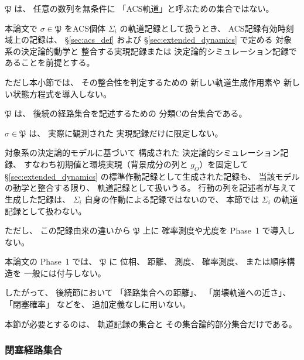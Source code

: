 \begin{remark}[軌道記録空間の力学的意味]
\label{rem:trajectory_space_scope}
$\mathfrak{P}$ は、
任意の数列を無条件に
「ACS軌道」と呼ぶための集合ではない。

本論文で
$\sigma\in\mathfrak{P}$
をACS個体 $\Sigma_i$ の軌道記録として扱うとき、
ACS記録有効時刻域上の記録は、
\S\ref{sec:acs_def}
および
\S\ref{sec:extended_dynamics}
で定める
対象系の決定論的動学と
整合する実現記録または
決定論的シミュレーション記録であることを前提とする。

ただし本小節では、
その整合性を判定するための
新しい軌道生成作用素や
新しい状態方程式を導入しない。

$\mathfrak{P}$ は、
後続の経路集合を記述するための
分類Cの台集合である。
\end{remark}

\begin{remark}
\label{rem:trajectory_record_origin}
$\sigma\in\mathfrak{P}$
は、
実際に観測された
実現記録だけに限定しない。

対象系の決定論的モデルに基づいて
構成された
決定論的シミュレーション記録、
すなわち初期値と環境実現（背景成分の列と $g_O$）を固定して
\S\ref{sec:extended_dynamics} の標準作動記録として生成された記録も、
当該モデルの動学と整合する限り、
軌道記録として扱いうる。
行動の列を記述者が与えて生成した記録は、
$\Sigma_i$ 自身の作動による記録ではないので、
本節では $\Sigma_i$ の軌道記録として扱わない。

ただし、
この記録由来の違いから
$\mathfrak{P}$ 上に
確率測度や尤度を
Phase~1 で導入しない。
\end{remark}

\begin{remark}
\label{rem:trajectory_space_no_extra_structure}
本論文の Phase~1 では、
$\mathfrak{P}$ に
位相、
距離、
測度、
確率測度、
または順序構造を
一般には付与しない。

したがって、
後続節において
「経路集合への距離」、
「崩壊軌道への近さ」、
「閉塞確率」
などを、
追加定義なしに用いない。

本節が必要とするのは、
軌道記録の集合と
その集合論的部分集合だけである。
\end{remark}

\subsubsection{閉塞経路集合}

